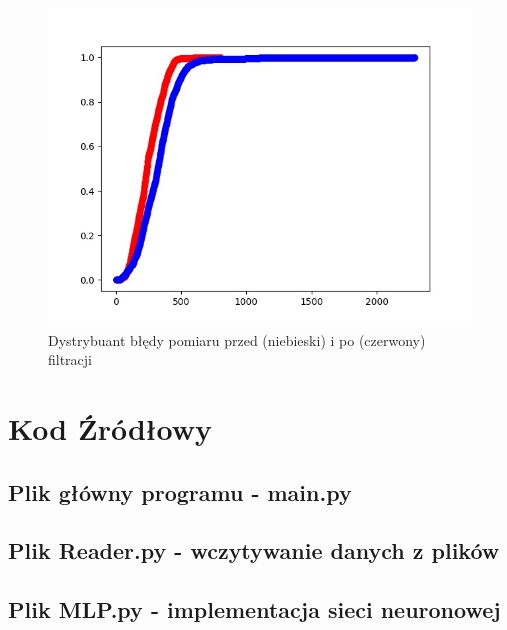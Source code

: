 \documentclass{classrep}
\begin{document}
{        \begin{figure}[!htbp]
            \centering
            \includegraphics[width=\textwidth]{img/distribution.jpg}
            \caption{Dystrybuant błędy pomiaru przed (niebieski) i po (czerwony) filtracji}
        \end{figure}
        \FloatBarrier
    }
    \newpage

    \section{Kod Źródłowy} \label{kod_zrodlowy} {

        \subsection{Plik główny programu - main.py} {
            
        }

        \subsection{Plik Reader.py - wczytywanie danych z plików} {
            
        }

        \subsection{Plik MLP.py - implementacja sieci neuronowej} {
            
        }
    }
\end{document}
